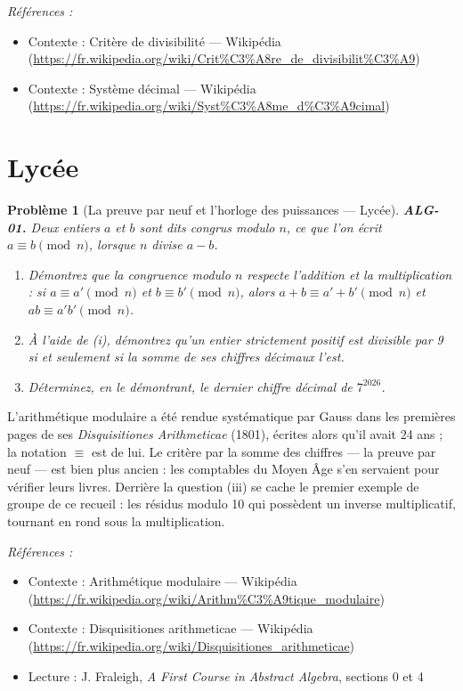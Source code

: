 \documentclass[11pt]{article}
\newtheorem{problem}{Problème}
\newenvironment{refs}{\par\small\noindent\emph{Références :}\begin{itemize}\setlength\itemsep{0pt}}{\end{itemize}\normalsize}
\begin{document}
\begin{refs}
\item Contexte : Critère de divisibilité --- Wikipédia (\url{https://fr.wikipedia.org/wiki/Crit%C3%A8re_de_divisibilit%C3%A9})
\item Contexte : Système décimal --- Wikipédia (\url{https://fr.wikipedia.org/wiki/Syst%C3%A8me_d%C3%A9cimal})
\end{refs}

\bigskip


\section*{Lycée}

\begin{problem}[{La preuve par neuf et l'horloge des puissances --- Lycée}]
\textbf{ALG-01.} Deux entiers $a$ et $b$ sont dits \textit{congrus
modulo $n$}, ce que l'on écrit $a \equiv b \pmod{n}$, lorsque $n$ divise $a-b$.
\begin{enumerate}
\item[(i)] Démontrez que la
congruence modulo $n$ respecte l'addition et la multiplication : si $a \equiv a' \pmod{n}$ et
$b \equiv b' \pmod{n}$, alors $a+b \equiv a'+b' \pmod{n}$ et $ab \equiv a'b' \pmod{n}$.
\item[(ii)] À l'aide de (i), démontrez qu'un entier strictement positif est divisible par 9 si et seulement si la somme de ses
chiffres décimaux l'est.
\item[(iii)] Déterminez, en le démontrant, le dernier chiffre décimal de
$7^{2026}$.
\end{enumerate}

\end{problem}

\noindent L'arithmétique modulaire a été rendue systématique par Gauss dans les premières pages de ses
\textit{Disquisitiones Arithmeticae} (1801), écrites alors qu'il avait 24 ans ; la notation $\equiv$ est de lui. Le
critère par la somme des chiffres --- la \og{} preuve par neuf \fg{} --- est bien plus ancien : les comptables du Moyen Âge
s'en servaient pour vérifier leurs livres. Derrière la question (iii) se cache le premier exemple de groupe de ce
recueil : les résidus modulo 10 qui possèdent un inverse multiplicatif, tournant en rond sous la multiplication.

\begin{refs}
\item Contexte : Arithmétique modulaire --- Wikipédia (\url{https://fr.wikipedia.org/wiki/Arithm%C3%A9tique_modulaire})
\item Contexte : Disquisitiones arithmeticae --- Wikipédia (\url{https://fr.wikipedia.org/wiki/Disquisitiones_arithmeticae})
\item Lecture : J. Fraleigh, \textit{A First Course in Abstract Algebra}, sections 0 et 4
\end{refs}
\end{document}
